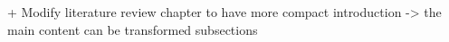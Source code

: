 + Modify literature review chapter to have more compact introduction -> the main content can be transformed subsections

